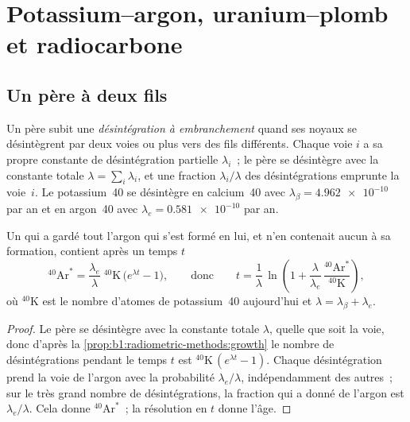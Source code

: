 \section{Potassium--argon, uranium--plomb et radiocarbone}\label{sec:b1:radiometric-methods:kar}

\subsection*{Un père à deux fils}

\begin{definition}\label{def:b1:radiometric-methods:branching}
Un père subit une \emph{désintégration à embranchement} quand ses noyaux
se désintègrent par deux voies ou plus vers des fils différents. Chaque voie $i$ a sa propre
constante de désintégration partielle $\lambda_i$~; le père se désintègre avec la constante totale
$\lambda = \sum_i \lambda_i$, et une fraction $\lambda_i/\lambda$ des désintégrations
emprunte la voie~$i$. Le potassium~40 se désintègre en calcium~40 avec $\lambda_\beta =
\num{4.962e-10}$ par an et en argon~40 avec $\lambda_e = \num{0.581e-10}$ par
an.
\end{definition}

\begin{proposition}\label{prop:b1:radiometric-methods:kar}
Un  qui a gardé tout l'argon qui s'est formé en lui, et n'en contenait aucun à sa
formation, contient après un temps $t$
\[
  {}^{40}\mathrm{Ar}^* = \frac{\lambda_e}{\lambda}\;{}^{40}\mathrm{K}\,\bigl(e^{\lambda t} - 1\bigr),
  \qquad\text{donc}\qquad
  t = \frac{1}{\lambda}\,\ln\!\left(1 + \frac{\lambda}{\lambda_e}\,
      \frac{{}^{40}\mathrm{Ar}^*}{{}^{40}\mathrm{K}}\right),
\]
où ${}^{40}\mathrm{K}$ est le nombre d'atomes de potassium~40 aujourd'hui et $\lambda =
\lambda_\beta + \lambda_e$.
\end{proposition}

\begin{proof}
Le père se désintègre avec la constante totale $\lambda$, quelle que soit la voie, donc d'après la
\cref{prop:b1:radiometric-methods:growth} le nombre de désintégrations pendant le temps $t$ est
${}^{40}\mathrm{K}\,(e^{\lambda t} - 1)$. Chaque désintégration prend la voie de l'argon avec la
probabilité $\lambda_e/\lambda$, indépendamment des autres~; sur le très
grand nombre de désintégrations, la fraction qui a donné de l'argon est $\lambda_e/\lambda$. Cela
donne ${}^{40}\mathrm{Ar}^*$~; la résolution en $t$ donne l'âge.
\end{proof}

